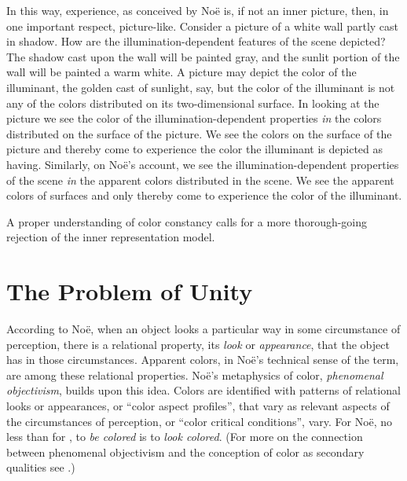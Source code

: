 \documentclass[12pt]{article}
\begin{document}
In this way, experience, as conceived by Noë is, if not an inner picture, then, in one important respect, picture-like. Consider a picture of a white wall partly cast in shadow. How are the illumination-dependent features of the scene depicted? The shadow cast upon the wall will be painted gray, and the sunlit portion of the wall will be painted a warm white. A picture may depict the color of the illuminant, the golden cast of sunlight, say, but the color of the illuminant is not any of the colors distributed on its two-dimensional surface. In looking at the picture we see the color of the illumination-dependent properties \emph{in} the colors distributed on the surface of the picture. We see the colors on the surface of the picture and thereby come to experience the color the illuminant is depicted as having. Similarly, on Noë's account, we see the illumination-dependent properties of the scene \emph{in} the apparent colors distributed in the scene. We see the apparent colors of surfaces and only thereby come to experience the color of the illuminant. 

A proper understanding of color constancy calls for a more thorough-going rejection of the inner representation model.


\section{The Problem of Unity} %
\label{sec:the_problem_of_unity}

According to Noë, when an object looks a particular way in some circumstance of perception, there is a relational property, its \emph{look} or \emph{appearance}, that the object has in those circumstances. Apparent colors, in Noë's technical sense of the term, are among these relational properties. Noë's metaphysics of color, \emph{phenomenal objectivism}, builds upon this idea. Colors are identified with patterns of relational looks or appearances, or ``color aspect profiles'', that vary as relevant aspects of the circumstances of perception, or ``color critical conditions'', vary. For Noë, no less than for \citet{Locke:1706hc}, to \emph{be colored} is to \emph{look colored}. (For more on the connection between phenomenal objectivism and the conception of color as secondary qualities see \citealt{Allen:2008kx}.)
\end{document}
